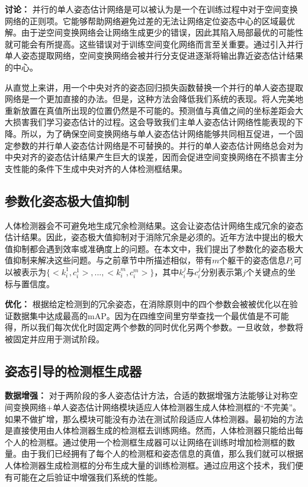 \textbf{讨论：} 并行的单人姿态估计网络是可以被认为是一个在训练过程中对于空间变换网络的正则项。它能够帮助网络避免过差的无法让网络定位姿态中心的区域最优解。由于逆空间变换网络会让网络生成更少的错误，因此其陷入局部最优的可能性就可能会有所提高。这些错误对于训练空间变化网络而言至关重要。通过引入并行单人姿态提取网络，空间变换网络会被并行分支促进逐渐将输出靠近姿态估计结果的中心。

从直觉上来讲，用一个中央对齐的姿态回归损失函数替换一个并行的单人姿态提取网络是一个更加直接的办法。但是，这种方法会降低我们系统的表现。将人完美地重新放置在真值所出现的位置仍然是不可能的。预测值与真值之间的坐标差距会大大损害我们学习姿态估计的过程。这会导致我们主单人姿态估计网络性能表现的下降。所以，为了确保空间变换网络与单人姿态估计网络能够共同相互促进，一个固定参数的并行单人姿态估计网络是不可替换的。并行的单人姿态估计网络总会对为中央对齐的姿态估计结果产生巨大的误差，因而会促进空间变换网络在不损害主分支性能的条件下生成中央对齐的人体检测框结果。

\subsection*{参数化姿态极大值抑制}
人体检测器会不可避免地生成冗余检测结果。这会让姿态估计网络生成冗余的姿态估计结果。因此，姿态极大值抑制对于消除冗余是必须的。近年方法中提出的极大值抑制都会遇到效率或准确度上的问题。在本文中，我们提出了参数化的姿态极大值抑制来解决这些问题。与之前章节中所描述相似，带有$m$个躯干的姿态信息$P_i$可以被表示为$\{<k_i^1, c_i^1>, ...,<k_i^m, c_i^m>\}$，其中$k_i^j$与$c_i^j$分别表示第$j$个关键点的坐标与置信度。

\textbf{优化：} 根据给定检测到的冗余姿态，在消除原则中的四个参数会被被优化以在验证数据集中达成最高的mAP。因为在四维空间里穷举查找一个最优值是不可能得，所以我们每次优化时固定两个参数的同时优化另两个参数。一旦收敛，参数将被固定并应用于测试阶段。

\subsection*{姿态引导的检测框生成器}
\textbf{数据增强：} 对于两阶段的多人姿态估计方法，合适的数据增强方法能够让对称空间变换网络+单人姿态估计网络模块适应人体检测器生成人体检测框的“不完美”。如果不做扩增，那么模块可能没有办法在测试阶段适应人体检测器。最初始的方法是直接使用由人体检测器生成的检测框去训练网络。然而，人体检测器只能给出每个人的检测框。通过使用一个检测框生成器可以让网络在训练时增加检测框的数量。由于我们已经拥有了每个人的检测框和姿态信息的真值，那么我们就可以根据人体检测器生成检测框的分布生成大量的训练检测框。通过应用这个技术，我们便有可能在之后验证中增强我们系统的性能。


